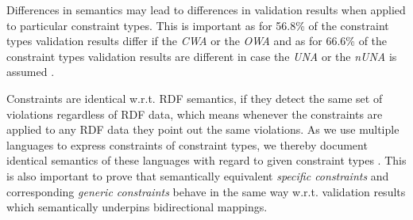\documentclass[a4paper,fontsize=11pt]{scrartcl}
\begin{document}
%
%
%
%
Differences in semantics may lead to differences in validation results when applied to particular constraint types.
This is important 
as for 56.8\% of the constraint types validation results differ if the \emph{CWA} or the \emph{OWA} 
and as for 66.6\% of the constraint types validation results are different in case the \emph{UNA} or the \emph{nUNA} is assumed \cite{BoschNolleAcarEckert2015}.

Constraints are identical w.r.t. RDF semantics, 
if they detect the same set of violations regardless of RDF data, 
which means whenever the constraints are applied to any RDF data they point out the same violations.
As we use multiple languages to express constraints of constraint types, 
we thereby document identical semantics of these languages with regard to given constraint types \cite{BoschNolleAcarEckert2015}.
This is also important to prove that semantically equivalent \emph{specific constraints} and corresponding \emph{generic constraints}
behave in the same way w.r.t. validation results which semantically underpins bidirectional mappings.
\end{document}
